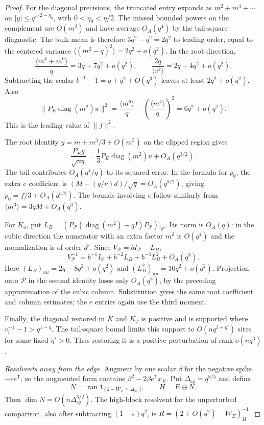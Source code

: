 \begin{proof}
For the diagonal precisions, the truncated entry expands as
$m^2+m^4+\cdots$ on $|y|\le q^{1/2-\eta_0}$, with
$0<\eta_0<\eta/2$. The missed bounded powers on the complement are
$O(m^2)$ and have average $O_A(q^4)$ by the tail-square diagnostic.
The bulk mean is therefore $3q^2-q^2=2q^2$ to leading order, equal
to the centered variance $\langle(m^2-q)^2\rangle=2q^2+o(q^2)$.
In the root direction,
\[
 \frac{\langle m^4+m^6\rangle}{q}=3q+7q^2+o(q^2),\qquad
 \frac{2q}{\langle v^2\rangle}=2q+4q^2+o(q^2).
\]
Subtracting the scalar $b^{-1}-1=q+q^2+O(q^3)$ leaves at least
$2q^2+o(q^2)$. Also
\[
 \|P_E\operatorname{diag}(m^2)u\|^2
 =\frac{\langle m^6\rangle}{q}
       -\left(\frac{\langle m^4\rangle}{q}\right)^2
 =6q^2+o(q^2).
\]
This is the leading value of $\|f\|^2$.

The root identity $y=m+m^3/3+O(m^5)$ on the clipped region gives
\[
 \frac{P_Ey}{\sqrt{nq}}
 =\frac13P_E\operatorname{diag}(m^2)u+O_A(q^{3/2}).
\]
The tail contributes $O_A(q^4/q)$ to its squared error. In the formula
for $p_0$, the extra $e$ coefficient is
$(M-(q/\nu)d)/\sqrt q=O_A(q^{3/2})$, giving $p_0=f/3+O_A(q^{3/2})$.
The bounds involving $e$ follow similarly from
$\langle m^3\rangle=3qM+O_A(q^3)$.

For $K_o$, put
$L_B=(P_{\mathcal P}(\operatorname{diag}(m^2)-qI)P_{\mathcal P})|_{\mathcal P}$.
Its norm is $O_A(q)$: in the cubic direction the numerator with an
extra factor $m^2$ is $O(q^4)$ and the normalization is of order
$q^3$. Since $V_{\mathcal P}=bI_{\mathcal P}-L_B$,
\[
 V_{\mathcal P}^{-1}
 =b^{-1}I_{\mathcal P}+b^{-2}L_B+b^{-3}L_B^2+O_A(q^3).
\]
Here $(L_B)_{uu}=2q-8q^2+o(q^2)$ and
$(L_B^2)_{uu}=10q^2+o(q^2)$. Projection onto $\mathcal P$ in the
second identity loses only $O_A(q^3)$, by the preceding approximation
of the cubic column. Substitution gives the same root coefficient and
column estimates; the $e$ entries again use the third moment.

Finally, the diagonal restored in $K$ and $K_T$ is positive and is
supported where $v_i^{-1}-1>q^{1-\eta}$. The tail-square bound limits
this support to $O(nq^{3+\eta'})$ sites for some fixed $\eta'>0$.
Thus restoring it is a positive perturbation of rank $o(nq^3)$.

\par\smallskip\noindent\textit{Resolvents away from the edge.}\enspace
Augment by one scalar $\beta$ for the negative spike $-ee^{\mathsf T}$,
so the augmented form contains
$\beta^2-2\beta e^{\mathsf T}x_E$. Put
$\Delta_{\mathrm{sp}}=q^{8/5}$ and define
\[
 N=\operatorname{ran}\mathbf1_{\{\,2-W_E\le\Delta_{\mathrm{sp}}\,\}},
 \qquad H=E\ominus N.
\]
Then $\dim N=O(n\Delta_{\mathrm{sp}}^{3/2})$. The high-block resolvent
for the unperturbed comparison, also after subtracting
$(1-\epsilon)q^2$, is
\(R=(2+O(q^2)-W_E)^{-1}_H\).


\end{proof}
